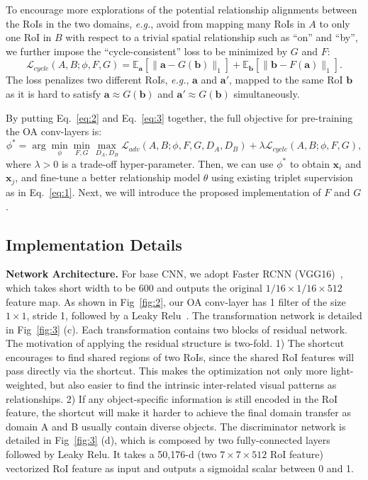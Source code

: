 \documentclass[runningheads]{llncs}
\newcommand{\eg}{\textit{e.g.}}
\begin{document}
To encourage more explorations of the potential relationship alignments between the RoIs in the two domains, \eg, avoid from mapping many RoIs in $A$ to only one RoI in $B$ with respect to a trivial spatial relationship such as ``on'' and ``by'', we further impose the ``cycle-consistent'' loss to be minimized by $G$ and $F$:
\begin{equation}\label{eq:3}
\mathcal{L}_{cycle}(A, B; \phi, F, G) = \mathbb{E}_\mathbf{a}[\|\mathbf{a}-G(\mathbf{b})\|_1]+\mathbb{E}_\mathbf{b}[\|\mathbf{b}-F(\mathbf{a})\|_1].
\end{equation}
The loss penalizes two different RoIs, \eg, $\mathbf{a}$ and $\mathbf{a}'$,  mapped to the same RoI $\mathbf{b}$ as it is hard to satisfy $\mathbf{a}\approx G(\mathbf{b})$ and $\mathbf{a}'\approx G(\mathbf{b})$ simultaneously.

By putting Eq.~\eqref{eq:2} and Eq.~\eqref{eq:3} together, the full objective for pre-training the OA conv-layers is:
\begin{equation}\label{eq:4}
\phi^* = \arg\min\limits_\phi\min\limits_{F, G}\max\limits_{D_A, D_B}\mathcal{L}_{adv}(A, B; \phi, F, G, D_A, D_B)+\lambda\mathcal{L}_{cycle}(A, B; \phi, F, G),
\end{equation}
where $\lambda>0$ is a trade-off hyper-parameter. Then, we can use $\phi^*$ to obtain $\mathbf{x}_i$ and $\mathbf{x}_j$, and fine-tune a better relationship model $\theta$ using existing triplet supervision as in Eq.~\eqref{eq:1}. Next, we will introduce the proposed implementation of $F$ and $G$.

\subsection{Implementation Details}
\noindent\textbf{Network Architecture.}
For base CNN, we adopt Faster RCNN (VGG16)~\cite{ren2015faster}, which takes short width to be 600 and outputs the original $1/16\times 1/16 \times 512$ feature map. As shown in Fig~\ref{fig:2}, our OA conv-layer has 1 filter of the size $1\times 1$, stride 1, followed by a Leaky Relu~\cite{xu2015empirical}. The transformation network is detailed in Fig~\ref{fig:3} (c). Each transformation contains two blocks of residual network. The motivation of applying the residual structure is two-fold. 1) The shortcut encourages to find shared regions of two RoIs, since the shared RoI features will pass directly via the shortcut. This makes the optimization not only more light-weighted, but also easier to find the intrinsic inter-related visual patterns as relationships. 2) If any object-specific information is still encoded in the RoI feature, the shortcut will make it harder to achieve the final domain transfer as domain A and B usually contain diverse objects. The discriminator network is detailed in Fig~\ref{fig:3} (d), which is composed by two fully-connected layers followed by Leaky Relu. It takes a 50,176-d (two $ 7 \times 7 \times 512$ RoI feature) vectorized RoI feature as input and outputs a sigmoidal scalar between 0 and 1.
\end{document}
